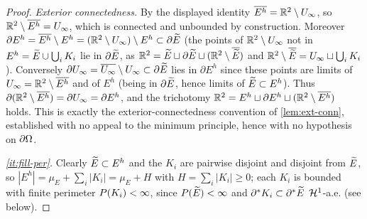 \begin{proof}
\emph{Exterior connectedness.} By the displayed identity
$\overline{E^h}=\mathbb{R}^2\setminus U_\infty$, so $\mathbb{R}^2\setminus\overline{E^h}=
U_\infty$, which is connected and unbounded by construction. Moreover
$\partial E^h=\overline{E^h}\setminus E^h=(\mathbb{R}^2\setminus U_\infty)\setminus
E^h\subset\partial\widetilde{E}$ (the points of $\mathbb{R}^2\setminus U_\infty$ not in
$E^h=\widetilde{E}\cup\bigcup_iK_i$ lie in $\partial\widetilde{E}$, as
$\mathbb{R}^2=\widetilde{E}\sqcup\partial\widetilde{E}\sqcup(\mathbb{R}^2\setminus\overline{\widetilde{E}})$ and
$\mathbb{R}^2\setminus\overline{\widetilde{E}}=U_\infty\sqcup\bigcup_iK_i$). Conversely
$\partial U_\infty=\overline{U_\infty}\setminus U_\infty\subset\partial\widetilde{E}$
lies in $\partial E^h$ since these points are limits of $U_\infty=\mathbb{R}^2
\setminus\overline{E^h}$ and of $E^h$ (being in $\partial\widetilde{E}$, hence limits
of $\widetilde{E}\subset E^h$). Thus $\partial(\mathbb{R}^2\setminus\overline{E^h})=\partial
U_\infty=\partial E^h$, and the trichotomy $\mathbb{R}^2=E^h\sqcup\partial E^h\sqcup
(\mathbb{R}^2\setminus\overline{E^h})$ holds. This is exactly the
exterior-connectedness convention of \cref{lem:ext-conn}, established with no
appeal to the minimum principle, hence with no hypothesis on $\partial\Omega$.

\emph{\ref{it:fill-per}.} Clearly $\widetilde{E}\subset E^h$ and the $K_i$ are
pairwise disjoint and disjoint from $\widetilde{E}$, so $|E^h|=\mu_E+\sum_i|K_i|=
\mu_E+H$ with $H=\sum_i|K_i|\ge0$; each $K_i$ is bounded with finite
perimeter $P(K_i)<\infty$, since $P(\widetilde{E})<\infty$ and
$\partial^*K_i\subset\partial^*\widetilde{E}$ $\mathcal{H}^1$-a.e. (see below).


\end{proof}
